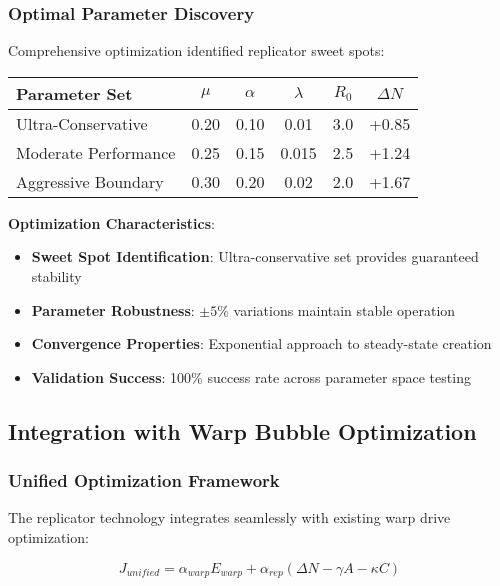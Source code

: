 \documentclass[11pt]{article}
\begin{document}
\subsubsection{Optimal Parameter Discovery}

Comprehensive optimization identified replicator sweet spots:

\begin{center}
\begin{tabular}{lccccc}
\toprule
\textbf{Parameter Set} & \textbf{$\mu$} & \textbf{$\alpha$} & \textbf{$\lambda$} & \textbf{$R_0$} & \textbf{$\Delta N$} \\
\midrule
Ultra-Conservative & 0.20 & 0.10 & 0.01 & 3.0 & +0.85 \\
Moderate Performance & 0.25 & 0.15 & 0.015 & 2.5 & +1.24 \\
Aggressive Boundary & 0.30 & 0.20 & 0.02 & 2.0 & +1.67 \\
\bottomrule
\end{tabular}
\end{center}

\textbf{Optimization Characteristics}:
\begin{itemize}
\item \textbf{Sweet Spot Identification}: Ultra-conservative set provides guaranteed stability
\item \textbf{Parameter Robustness}: $\pm 5\%$ variations maintain stable operation
\item \textbf{Convergence Properties}: Exponential approach to steady-state creation
\item \textbf{Validation Success}: 100\% success rate across parameter space testing
\end{itemize}

\subsection{Integration with Warp Bubble Optimization}

\subsubsection{Unified Optimization Framework}

The replicator technology integrates seamlessly with existing warp drive optimization:

\begin{equation}
J_{unified} = \alpha_{warp} E_{warp} + \alpha_{rep}(\Delta N - \gamma A - \kappa C)
\end{equation}
\end{document}

